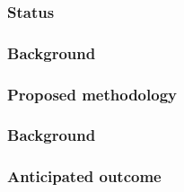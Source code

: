 \begin{itemize}
\subsubsection{Status} 


\subsubsection{Background} 


\subsubsection{Proposed methodology} 


\subsubsection{Background} 


\subsubsection{Anticipated outcome}







\end{itemize}
